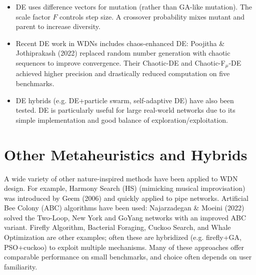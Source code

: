 \documentclass[12pt, a4paper]{article}
\begin{document}
\begin{itemize}
	\item DE uses difference vectors for mutation (rather than GA-like mutation). The scale factor $F$ controls step size. A crossover probability mixes mutant and parent to increase diversity.
	\item Recent DE work in WDNs includes chaos-enhanced DE: Poojitha \& Jothiprakash (2022) replaced random number generation with chaotic sequences to improve convergence. Their Chaotic-DE and Chaotic-F$_\mu$-DE achieved higher precision and drastically reduced computation on five benchmarks\cite{ref8}.
	\item DE hybrids (e.g. DE+particle swarm, self-adaptive DE) have also been tested. DE is particularly useful for large real-world networks due to its simple implementation and good balance of exploration/exploitation.
\end{itemize}

\section*{Other Metaheuristics and Hybrids}
A wide variety of other nature-inspired methods have been applied to WDN design. For example, Harmony Search (HS) (mimicking musical improvisation) was introduced by Geem (2006) and quickly applied to pipe networks\cite{ref4}. Artificial Bee Colony (ABC) algorithms have been used: Najarzadegan \& Moeini (2022) solved the Two-Loop, New York and GoYang networks with an improved ABC variant\cite{ref9}. Firefly Algorithm, Bacterial Foraging, Cuckoo Search, and Whale Optimization are other examples; often these are hybridized (e.g. firefly+GA, PSO+cuckoo) to exploit multiple mechanisms\cite{ref10}. Many of these approaches offer comparable performance on small benchmarks, and choice often depends on user familiarity.
\end{document}
